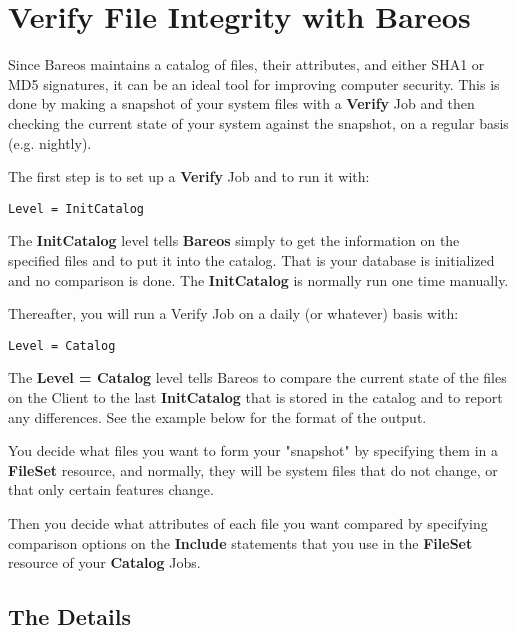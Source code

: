 
\chapter{Verify File Integrity with Bareos}
\label{VerifyChapter}

Since Bareos maintains a catalog of files, their attributes, and either SHA1
or MD5 signatures, it can be an ideal tool for improving computer security.
This is done by making a snapshot of your system files with a {\bf Verify} Job
and then checking the current state of your system against the snapshot, on a
regular basis (e.g. nightly).

The first step is to set up a {\bf Verify} Job and to run it with:

\footnotesize
\begin{verbatim}
Level = InitCatalog
\end{verbatim}
\normalsize

The {\bf InitCatalog} level tells {\bf Bareos} simply to get the information on
the specified files and to put it into the catalog. That is your database is
initialized and no comparison is done. The {\bf InitCatalog} is normally run
one time manually.

Thereafter, you will run a Verify Job on a daily (or whatever) basis with:

\footnotesize
\begin{verbatim}
Level = Catalog
\end{verbatim}
\normalsize

The {\bf Level = Catalog} level tells Bareos to compare the current state of
the files on the Client to the last {\bf InitCatalog} that is stored in the
catalog and to report any differences. See the example below for the format of
the output.

You decide what files you want to form your "snapshot" by specifying them in
a {\bf FileSet} resource, and normally, they will be system files that do not
change, or that only certain features change.

Then you decide what attributes of each file you want compared by specifying
comparison options on the {\bf Include} statements that you use in the {\bf
FileSet} resource of your {\bf Catalog} Jobs.

\section{The Details}

